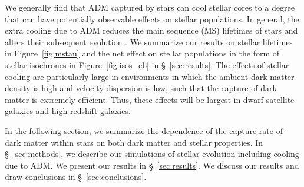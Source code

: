 \documentclass[useAMS,usenatbib]{mnras}
\begin{document}




  We generally find that ADM captured by stars can cool stellar cores to a degree that can have potentially 
  observable effects on stellar populations. In general, the extra cooling due to ADM reduces the main sequence (MS) lifetimes 
  of stars and alters their subsequent evolution . We summarize our results on stellar lifetimes in Figure~\ref{fig:mstau} 
  and the net effect on stellar populations in the form of stellar isochrones in Figure~\ref{fig:isos_cb} in 
  \S~\ref{sec:results}. The effects of stellar cooling are particularly large in environments in which 
  the ambient dark matter density is high and velocity dispersion is low, such that the capture of 
  dark matter is extremely efficient. Thus, these effects will be largest in dwarf satellite galaxies 
  and high-redshift galaxies. 
  
  In the following section, we summarize the dependence of the capture rate of dark matter 
  within stars on both dark matter and stellar properties. In \S~\ref{sec:methods}, we describe
  our simulations of stellar evolution including cooling due to ADM. We present our results 
  in \S~\ref{sec:results}. We discuss our results and draw conclusions in \S~\ref{sec:conclusions}.
  
\end{document}
